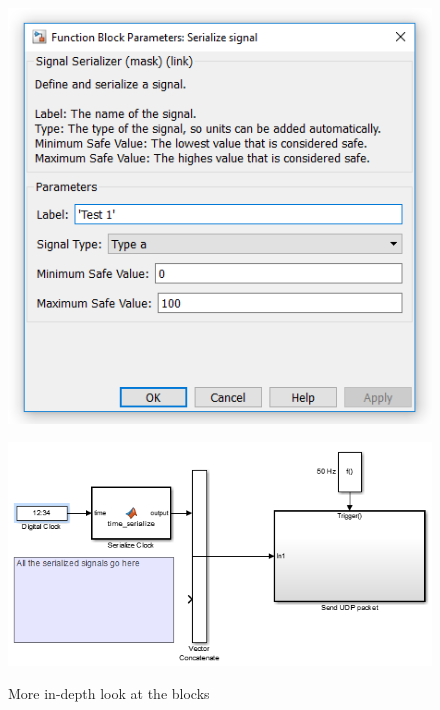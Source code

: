 \begin{figure}[H]
	\centering
	\begin{minipage}{.39\textwidth}
		\centering
		\includegraphics[width=\linewidth]{implementation/popup}
		\label{fig:firstpopup}
	\end{minipage}
	\begin{minipage}{.59\textwidth}
		\centering
		\includegraphics[width=\linewidth]{implementation/UDPPacket}
		\label{fig:firstudpsys}
	\end{minipage}
	\caption{More in-depth look at the blocks}
	\label{fig:firstimplementation}
\end{figure}

